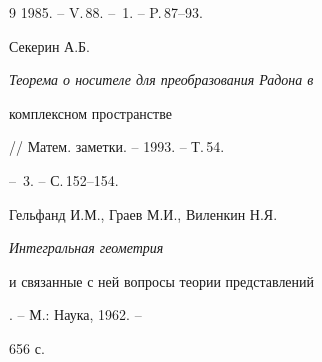 \begin{thebibliography}{9}
1985. -- V.\,88. -- \No\,1. -- P.\,87--93.


 




Секерин А.Б. {\em Теорема о носителе для преобразования Радона в 


комплексном пространстве} // Матем. заметки. -- 1993. -- Т.\,54. 


-- \No\,3. -- С.\,152--154. 


 




Гельфанд И.М., Граев М.И., Виленкин Н.Я. {\em Интегральная геометрия 


и связанные с ней вопросы теории представлений}. -- М.: Наука, 1962. -- 


656 с. 


 


 


\end{thebibliography} 


 


\vskip 2cm 


 










 


 


